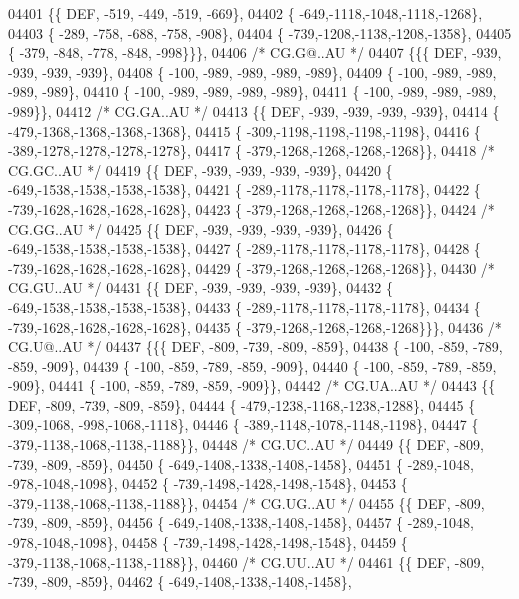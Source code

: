 \begin{DoxyCode}
04401 \{\{  DEF, -519, -449, -519, -669\},
04402 \{ -649,-1118,-1048,-1118,-1268\},
04403 \{ -289, -758, -688, -758, -908\},
04404 \{ -739,-1208,-1138,-1208,-1358\},
04405 \{ -379, -848, -778, -848, -998\}\}\},
04406 \textcolor{comment}{/* CG.G@..AU */}
04407 \{\{\{  DEF, -939, -939, -939, -939\},
04408 \{ -100, -989, -989, -989, -989\},
04409 \{ -100, -989, -989, -989, -989\},
04410 \{ -100, -989, -989, -989, -989\},
04411 \{ -100, -989, -989, -989, -989\}\},
04412 \textcolor{comment}{/* CG.GA..AU */}
04413 \{\{  DEF, -939, -939, -939, -939\},
04414 \{ -479,-1368,-1368,-1368,-1368\},
04415 \{ -309,-1198,-1198,-1198,-1198\},
04416 \{ -389,-1278,-1278,-1278,-1278\},
04417 \{ -379,-1268,-1268,-1268,-1268\}\},
04418 \textcolor{comment}{/* CG.GC..AU */}
04419 \{\{  DEF, -939, -939, -939, -939\},
04420 \{ -649,-1538,-1538,-1538,-1538\},
04421 \{ -289,-1178,-1178,-1178,-1178\},
04422 \{ -739,-1628,-1628,-1628,-1628\},
04423 \{ -379,-1268,-1268,-1268,-1268\}\},
04424 \textcolor{comment}{/* CG.GG..AU */}
04425 \{\{  DEF, -939, -939, -939, -939\},
04426 \{ -649,-1538,-1538,-1538,-1538\},
04427 \{ -289,-1178,-1178,-1178,-1178\},
04428 \{ -739,-1628,-1628,-1628,-1628\},
04429 \{ -379,-1268,-1268,-1268,-1268\}\},
04430 \textcolor{comment}{/* CG.GU..AU */}
04431 \{\{  DEF, -939, -939, -939, -939\},
04432 \{ -649,-1538,-1538,-1538,-1538\},
04433 \{ -289,-1178,-1178,-1178,-1178\},
04434 \{ -739,-1628,-1628,-1628,-1628\},
04435 \{ -379,-1268,-1268,-1268,-1268\}\}\},
04436 \textcolor{comment}{/* CG.U@..AU */}
04437 \{\{\{  DEF, -809, -739, -809, -859\},
04438 \{ -100, -859, -789, -859, -909\},
04439 \{ -100, -859, -789, -859, -909\},
04440 \{ -100, -859, -789, -859, -909\},
04441 \{ -100, -859, -789, -859, -909\}\},
04442 \textcolor{comment}{/* CG.UA..AU */}
04443 \{\{  DEF, -809, -739, -809, -859\},
04444 \{ -479,-1238,-1168,-1238,-1288\},
04445 \{ -309,-1068, -998,-1068,-1118\},
04446 \{ -389,-1148,-1078,-1148,-1198\},
04447 \{ -379,-1138,-1068,-1138,-1188\}\},
04448 \textcolor{comment}{/* CG.UC..AU */}
04449 \{\{  DEF, -809, -739, -809, -859\},
04450 \{ -649,-1408,-1338,-1408,-1458\},
04451 \{ -289,-1048, -978,-1048,-1098\},
04452 \{ -739,-1498,-1428,-1498,-1548\},
04453 \{ -379,-1138,-1068,-1138,-1188\}\},
04454 \textcolor{comment}{/* CG.UG..AU */}
04455 \{\{  DEF, -809, -739, -809, -859\},
04456 \{ -649,-1408,-1338,-1408,-1458\},
04457 \{ -289,-1048, -978,-1048,-1098\},
04458 \{ -739,-1498,-1428,-1498,-1548\},
04459 \{ -379,-1138,-1068,-1138,-1188\}\},
04460 \textcolor{comment}{/* CG.UU..AU */}
04461 \{\{  DEF, -809, -739, -809, -859\},
04462 \{ -649,-1408,-1338,-1408,-1458\},

\end{DoxyCode}
